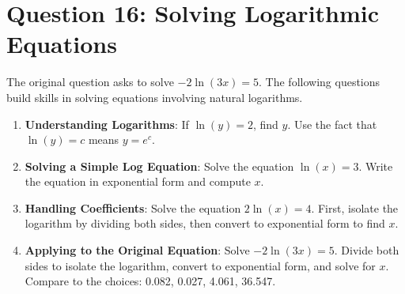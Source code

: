 \documentclass[12pt]{article}
\begin{document}
\section*{Question 16: Solving Logarithmic Equations}
The original question asks to solve \( -2 \ln (3x) = 5 \). The following questions build skills in solving equations involving natural logarithms.

\begin{enumerate}[label=16.\arabic*]
    \item \textbf{Understanding Logarithms}: If \( \ln(y) = 2 \), find \( y \). Use the fact that \( \ln(y) = c \) means \( y = e^c \).
    \item \textbf{Solving a Simple Log Equation}: Solve the equation \( \ln(x) = 3 \). Write the equation in exponential form and compute \( x \).
    \item \textbf{Handling Coefficients}: Solve the equation \( 2 \ln(x) = 4 \). First, isolate the logarithm by dividing both sides, then convert to exponential form to find \( x \).
    \item \textbf{Applying to the Original Equation}: Solve \( -2 \ln (3x) = 5 \). Divide both sides to isolate the logarithm, convert to exponential form, and solve for \( x \). Compare to the choices: 0.082, 0.027, 4.061, 36.547.
\end{enumerate}

\end{document}
